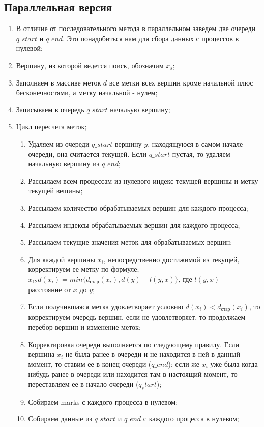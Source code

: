 \documentclass{report}
\begin{document}
\subsection{Параллельная версия}
\begin{enumerate}
 \item В отличие от последовательного метода в параллельном заведем две очереди $q\_start$ и $q\_end$.
	Это понадобиться нам для сбора данных с процессов в нулевой;
 \item Вершину, из которой ведется поиск, обозначим $x_{s}$;
 \item Заполняем в массиве меток $d$ все метки всех вершин кроме начальной плюс бесконечностями, а метку начальной - нулем;
 \item Записываем в очередь $q\_start$ начальую вершину;
 \item Цикл пересчета меток;
	\begin{enumerate}
	 \item Удаляем из очереди $q\_start$ вершину $y$, находящуюся в самом начале очереди, она считается текущей.
		Если $q\_start$ пустая, то удаляем начальную вершину из $q\_end$;
	 \item Рассылаем всем процессам из нулевого индекс текущей вершины и метку текущей вешины;
 	 \item Рассылаем количество обрабатываемых вершин для каждого процесса;
 	 \item Рассылаем индексы обрабатываемых вершин для каждого процесса;
 	 \item Рассылаем текущие значения меток для обрабатываемых вершин;
	 \item Для каждой вершины $x_{i}$, непосредственно достижимой из текущей, корректируем ее метку по формуле;
		$x_{12} d(x_{i})=min\{d_{стар}(x_{i}), d(y)+l(y,x)\}$, где $l(y,x)$ - расстояние от $x$ до $y$;
	 \item Если получившаяся метка удовлетворяет условию $d(x_{i}) < d_{стар}(x_{i})$, то корректируем очередь вершин,
		если не удовлетворяет, то продолжаем перебор вершин и изменение меток;
	 \item Корректировка очереди выполняется по следующему правилу.
		Если вершина $x_{i}$ не была ранее в очереди и не находится в ней в данный момент, то ставим
		ее в конец очереди ($q\_end$); если же $x_{i}$ уже была когда-нибудь ранее в очереди или
		находится там в настоящий момент, то переставляем ее в начало очереди ($q_start$);
	 \item Собираем marks с каждого процесса в нулевом;
	 \item Собираем данные из $q\_start$ и $q\_end$ с каждого процесса в нулевом;

\end{enumerate}
\end{enumerate}
\end{document}
